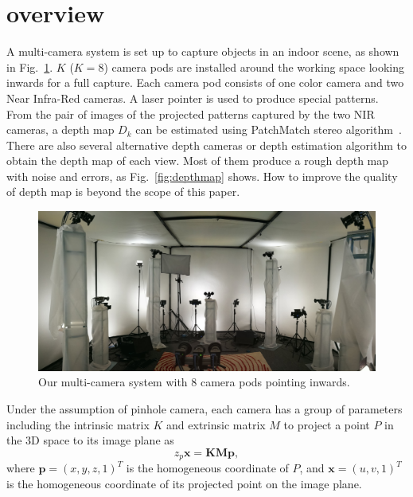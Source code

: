 \section{overview}
\label{sec:overview}



A multi-camera system is set up to capture objects in an indoor scene, as shown in Fig.~\ref{fig:rig}.
%
$K$ ($K=8$) camera pods are installed around the working space looking inwards for a full capture.
Each camera pod consists of one color camera and two Near Infra-Red cameras. A laser pointer is used to produce special patterns. From the pair of images of the projected patterns captured by the two NIR cameras, a depth map $D_k$ can be estimated using PatchMatch stereo algorithm~\cite{Bleyer2011PatchMatch}.
There are also several alternative depth cameras or depth estimation algorithm to obtain the depth map of each view. Most of them produce a rough depth map with noise and errors, as Fig.~\ref{fig:depthmap} shows.
How to improve the quality of depth map is beyond the scope of this paper.

\begin{figure}
	\centering
	\includegraphics[width=\columnwidth]{image/rig.jpg}
	\caption{Our multi-camera system with 8 camera pods pointing inwards.}
	\label{fig:rig}
\end{figure}


%
Under the assumption of pinhole camera, each camera has a group of parameters including the intrinsic matrix $K$ and extrinsic matrix $M$ to project a point $P$ in the 3D space to its image plane as
\begin{equation}\label{eq:cam-proj}
z_{p}\mathbf{x}=\mathbf{K}\mathbf{M}\mathbf{p},
\end{equation}
where $\mathbf{p}=(x,y,z,1)^{T}$ is the homogeneous coordinate of $P$, and $\mathbf{x}=(u,v,1)^{T}$ is the homogeneous coordinate of its projected point on the image plane.
%

